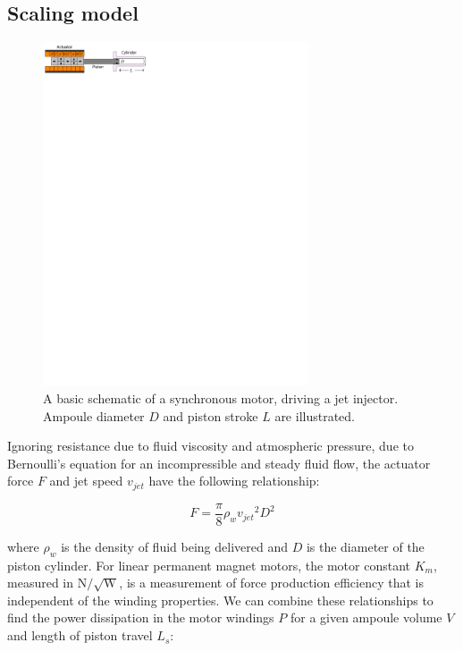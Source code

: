     \subsection{Scaling model}                  \label{Chapter:PMLSM design HM/electromagnetic model/scaling}


        \begin{figure}[ht]
          \centering
          \includegraphics[width=0.7\textwidth]{chap3/images/PMLSM_scaling_law_illustration.pdf}
          \caption{A basic schematic of a synchronous motor, driving a jet injector. Ampoule diameter $D$ and piston stroke $L$ are illustrated.}
          \label{fig:chapter/hm/PMLSM scaling law illustrated}
        \end{figure}


        Ignoring resistance due to fluid viscosity and atmospheric pressure, due to Bernoulli's equation for an incompressible and steady fluid flow, the actuator force $F$ and jet speed $v_{jet}$ have the following relationship:
        
        
        \begin{equation}
            F=\frac{\pi}{8}\rho_w {v_{jet}}^2 D^2
            \label{eq:actuation force by PMLSMs}
        \end{equation}
        
        
        where $\rho_w$ is the density of fluid being delivered and $D$ is the diameter of the piston cylinder. For linear permanent magnet motors, the motor constant $K_m$, measured in $\mathrm{N/\sqrt{W}}$, is a measurement of force production efficiency that is independent of the winding properties. We can combine these relationships to find the power dissipation in the motor windings $P$ for a given ampoule volume $V$ and length of piston travel $L_s$:


